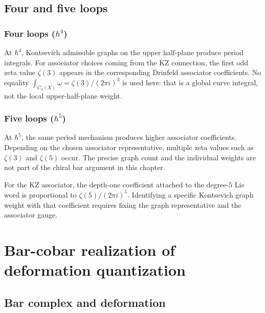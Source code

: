 \subsection{Four and five loops}

\subsubsection{\texorpdfstring{Four loops ($\hbar^4$)}{Four loops (4)}}

At $\hbar^4$, Kontsevich admissible graphs on the upper half-plane
produce period integrals. For associator choices coming from the KZ
connection, the first odd zeta value $\zeta(3)$ appears in the
corresponding Drinfeld associator coefficients. No equality
\(\int_{\overline{C}_4(X)}\omega=\zeta(3)/(2\pi i)^3\) is used here:
that is a global curve integral, not the local
upper-half-plane weight.

\subsubsection{\texorpdfstring{Five loops ($\hbar^5$)}{Five loops (5)}}

At $\hbar^5$, the same period mechanism produces higher associator
coefficients. Depending on the chosen associator representative,
multiple zeta values such as $\zeta(3)$ and $\zeta(5)$ occur. The
precise graph count and the individual weights are not part of the
chiral bar argument in this chapter.

\begin{example}
For the KZ associator, the depth-one coefficient attached to the
degree-$5$ Lie word is proportional to $\zeta(5)/(2\pi i)^5$.
Identifying a specific Kontsevich graph weight with that coefficient
requires fixing the graph representative and the associator gauge.
\end{example}

\section{Bar-cobar realization of deformation quantization}

\subsection{Bar complex and deformation}

